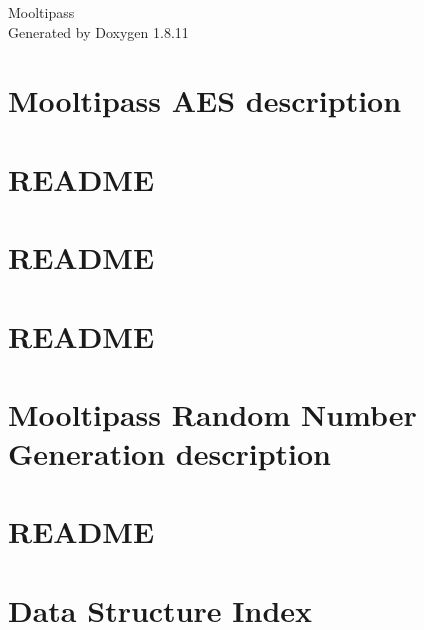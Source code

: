 \documentclass[twoside]{book}
\newcommand{\+}{\discretionary{\mbox{\scriptsize$\hookleftarrow$}}{}{}}
\newcommand{\clearemptydoublepage}{%
  \newpage{\pagestyle{empty}\cleardoublepage}%
}
\begin{document}
\hypersetup{pageanchor=false,
             bookmarksnumbered=true,
             pdfencoding=unicode
            }
\begin{titlepage}
\vspace*{7cm}
\begin{center}%
{\Large Mooltipass }\\
\vspace*{1cm}
{\large Generated by Doxygen 1.8.11}\\
\end{center}
\end{titlepage}
\clearemptydoublepage
\tableofcontents
\clearemptydoublepage
{}
\hypersetup{pageanchor=true}

\chapter{Mooltipass A\+ES description}
\label{md_src_AES_README}
\hypertarget{md_src_AES_README}{}

\chapter{R\+E\+A\+D\+ME}
\label{md_src_FLASH_README}
\hypertarget{md_src_FLASH_README}{}

\chapter{R\+E\+A\+D\+ME}
\label{md_src_NODEMGMT_README}
\hypertarget{md_src_NODEMGMT_README}{}

\chapter{R\+E\+A\+D\+ME}
\label{md_src_OLEDMP_README}
\hypertarget{md_src_OLEDMP_README}{}

\chapter{Mooltipass Random Number Generation description}
\label{md_src_RNG_README}
\hypertarget{md_src_RNG_README}{}

\chapter{R\+E\+A\+D\+ME}
\label{md_src_USB_README}
\hypertarget{md_src_USB_README}{}

\chapter{Data Structure Index}

\end{document}

